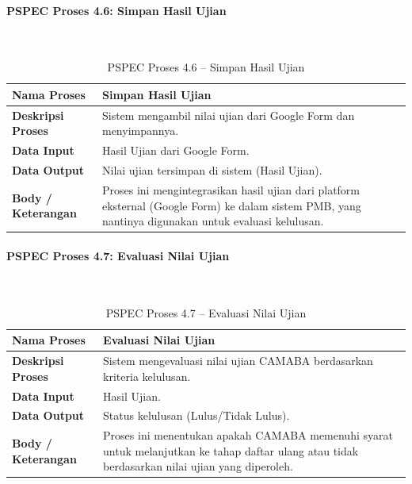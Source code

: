 \paragraph{PSPEC Proses 4.6: Simpan Hasil Ujian}~\\
\begin{longtable}{|p{}|p{}|}
	\caption{PSPEC Proses 4.6 -- Simpan Hasil Ujian}
	\label{table:3.pspec46}\\
	\hline
	\textbf{Nama Proses} & Simpan Hasil Ujian \\
	\hline
	\textbf{Deskripsi Proses} & Sistem mengambil nilai ujian dari Google Form dan menyimpannya. \\
	\hline
	\textbf{Data Input} & Hasil Ujian dari Google Form. \\
	\hline
	\textbf{Data Output} & Nilai ujian tersimpan di sistem (Hasil Ujian). \\
	\hline
	\textbf{Body / Keterangan} & Proses ini mengintegrasikan hasil ujian dari platform eksternal (Google Form) ke dalam sistem PMB, yang nantinya digunakan untuk evaluasi kelulusan. \\
	\hline
\end{longtable}

\paragraph{PSPEC Proses 4.7: Evaluasi Nilai Ujian}~\\
\begin{longtable}{|p{}|p{}|}
	\caption{PSPEC Proses 4.7 -- Evaluasi Nilai Ujian}
	\label{table:3.pspec47}\\
	\hline
	\textbf{Nama Proses} & Evaluasi Nilai Ujian \\
	\hline
	\textbf{Deskripsi Proses} & Sistem mengevaluasi nilai ujian CAMABA berdasarkan kriteria kelulusan. \\
	\hline
	\textbf{Data Input} & Hasil Ujian. \\
	\hline
	\textbf{Data Output} & Status kelulusan (Lulus/Tidak Lulus). \\
	\hline
	\textbf{Body / Keterangan} & Proses ini menentukan apakah CAMABA memenuhi syarat untuk melanjutkan ke tahap daftar ulang atau tidak berdasarkan nilai ujian yang diperoleh. \\
	\hline
\end{longtable}

